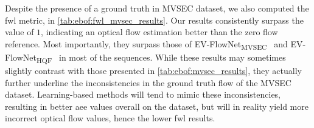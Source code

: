 Despite the presence of a ground truth in MVSEC dataset, we also computed the \acrshort{fwl} metric, in \cref{tab:ebof:fwl_mvsec_results}. Our results consistently surpass the value of \(1\), indicating an optical flow estimation better than the zero flow reference. Most importantly, they surpass those of EV-FlowNet\textsubscript{MVSEC}~\cite{Zhu2018EVFlowNetSO} and EV-FlowNet\textsubscript{HQF}~\cite{Stoffregen2020ReducingTS} in most of the sequences. While these results may sometimes slightly contrast with those presented in \cref{tab:ebof:mvsec_results}, they actually further underline the inconsistencies in the ground truth flow of the MVSEC dataset. Learning-based methods will tend to mimic these inconsistencies, resulting in better \acrshort{aee} values overall on the dataset, but will in reality yield more incorrect optical flow values, hence the lower \acrshort{fwl} results.

